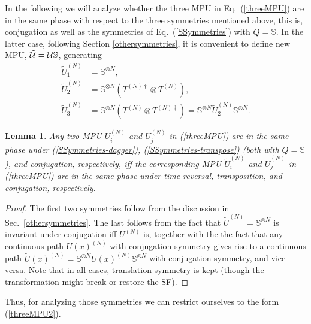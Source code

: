 \documentclass[pra,twocolumn,nofootinbib,superscriptaddress]{revtex4-1}
\newtheorem{lem}[thm]{Lemma}
\begin{document}
In the following we will analyze whether the three MPU in Eq.~(\ref{threeMPU})
are in the same phase with respect to the three symmetries mentioned
above, this is, conjugation as well as the symmetries of
Eq.~(\ref{SSymmetries}) with $Q=\mathbb S$. In the latter case, following Section
\ref{othersymmetries}, it is convenient to define new MPU, $\tilde {\cal
		U}=  {\cal U}\mathbb S$, generating
\begin{subequations}
	\label{threeMPU2}
	\begin{align}
		\tilde U_1^{(N)} & = \mathbb S^{\otimes N},                                \\
		\tilde U_2^{(N)} & = \mathbb S^{\otimes N}(T^{(N)\dagger}\otimes T^{(N)}), \\
		\label{tildeU3}
		\tilde U_3^{(N)} & = \mathbb S^{\otimes N}(T^{(N)}\otimes T^{(N)\dagger})=
		\mathbb S^{\otimes N}\tilde U_2^{(N)}\mathbb S^{\otimes N}.
	\end{align}
\end{subequations}

\begin{lem}
	\label{lemma:sym-trafo-swap}
	Any two MPU $U^{(N)}_i$ and $U^{(N)}_j$ in (\ref{threeMPU}) are in the
	same phase under (\ref{SSymmetries-dagger}),
	(\ref{SSymmetries-transpose}) (both with $Q=\mathbb S$), and conjugation,
	respectively, iff the corresponding MPU
	$\tilde U^{(N)}_i$ and $\tilde U^{(N)}_j$ in (\ref{threeMPU})
	are in the same phase under time reversal,
	transposition, and conjugation, respectively.
\end{lem}

\begin{proof}
	The first two symmetries follow from the discussion in
	Sec.~\ref{othersymmetries}.  The last follows from the fact that $\tilde
		U^{(N)}=\mathbb S^{\otimes N}$ is invariant under conjugation iff $U^{(N)}$ is,
	together with the the fact that any continuous path $U(x)^{(N)}$ with
	conjugation symmetry gives rise to a continuous path $\tilde
		U(x)^{(N)}=\mathbb S^{\otimes N}U(x)^{(N)}\mathbb S^{\otimes N}$ with conjugation
	symmetry, and vice versa. Note that in all cases, translation symmetry is
	kept (though the transformation might break or restore the SF).
\end{proof}

Thus, for analyzing those symmetries we can restrict ourselves to the form
(\ref{threeMPU2}).
\end{document}
